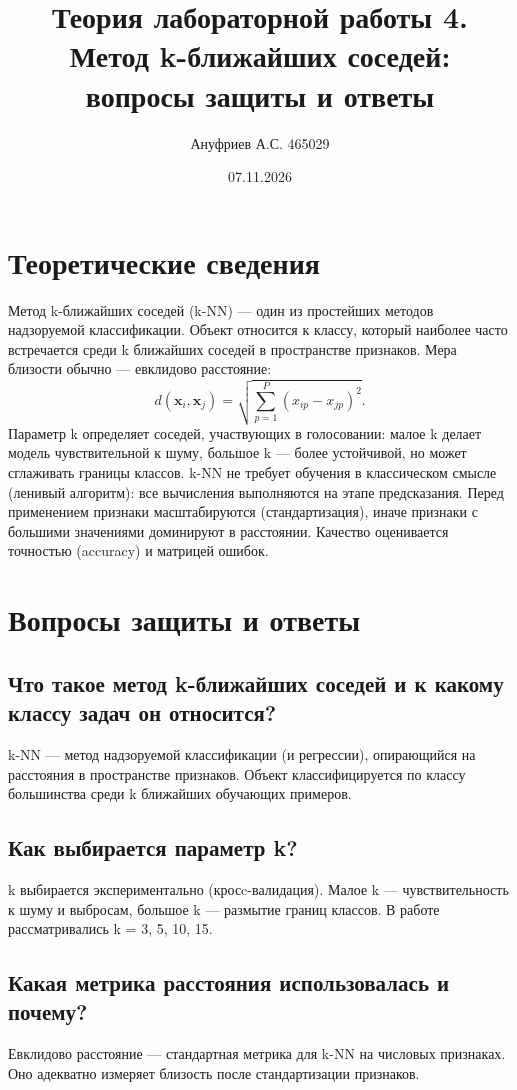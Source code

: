 \documentclass[12pt,a4paper]{article}
\title{Теория лабораторной работы 4. Метод k-ближайших соседей:\\вопросы защиты и ответы}
\author{Ануфриев А.С. 465029}
\date{07.11.2026}
\begin{document}
\maketitle

\section{Теоретические сведения}
Метод k-ближайших соседей (k-NN) --- один из простейших методов надзоруемой классификации. Объект относится к классу, который наиболее часто встречается среди k ближайших соседей в пространстве признаков. Мера близости обычно --- евклидово расстояние:
\begin{equation}
d(\mathbf{x}_i, \mathbf{x}_j) = \sqrt{\sum_{p=1}^{P} (x_{ip} - x_{jp})^2}.
\end{equation}
Параметр k определяет соседей, участвующих в голосовании: малое k делает модель чувствительной к шуму, большое k --- более устойчивой, но может сглаживать границы классов. k-NN не требует обучения в классическом смысле (ленивый алгоритм): все вычисления выполняются на этапе предсказания. Перед применением признаки масштабируются (стандартизация), иначе признаки с большими значениями доминируют в расстоянии. Качество оценивается точностью (accuracy) и матрицей ошибок.

\section{Вопросы защиты и ответы}

\subsection{Что такое метод k-ближайших соседей и к какому классу задач он относится?}
k-NN --- метод надзоруемой классификации (и регрессии), опирающийся на расстояния в пространстве признаков. Объект классифицируется по классу большинства среди k ближайших обучающих примеров.

\subsection{Как выбирается параметр k?}
k выбирается экспериментально (кросc-валидация). Малое k --- чувствительность к шуму и выбросам, большое k --- размытие границ классов. В работе рассматривались k = 3, 5, 10, 15.

\subsection{Какая метрика расстояния использовалась и почему?}
Евклидово расстояние --- стандартная метрика для k-NN на числовых признаках. Оно адекватно измеряет близость после стандартизации признаков.
\end{document}
